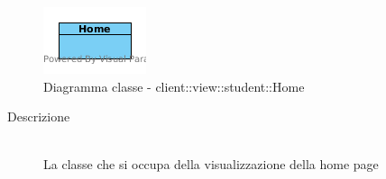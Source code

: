 \vspace{0.5cm}
\hypertarget{client::view::student::Home}{}
\begin{center}
			\begin{figure}[H]
				\centering \includegraphics[scale=4, max width=\textwidth, max height=\myheight]{../img/diagrammiClassi/client/view/student/Home.png}
				\caption{Diagramma classe - client::view::student::Home}
			\end{figure}
		\end{center}\begin{description}
\item[Descrizione] \hfill \\
 La classe che si occupa della visualizzazione della home page
\end{description}

\vspace{0.5cm}
